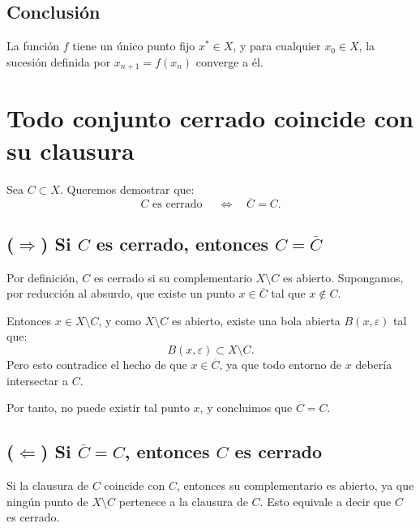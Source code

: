 \documentclass[12pt]{article}
\begin{document}
\subsection*{Conclusión}
La función $f$ tiene un único punto fijo $x^*\in X$, y para cualquier $x_0\in X$, la sucesión
definida por $x_{n+1}=f(x_n)$ converge a él.
\section*{Todo conjunto cerrado coincide con su clausura}

Sea $C \subset X$.  
Queremos demostrar que:
\[
C \text{ es cerrado } \quad \Longleftrightarrow \quad \overline{C} = C.
\]

\subsection*{($\Rightarrow$) Si $C$ es cerrado, entonces $C = \overline{C}$}
Por definición, $C$ es cerrado si su complementario $X \setminus C$ es abierto.  
Supongamos, por reducción al absurdo, que existe un punto $x \in \overline{C}$ tal que $x \notin C$.

Entonces $x \in X \setminus C$, y como $X \setminus C$ es abierto, existe una bola abierta
$B(x,\varepsilon)$ tal que:
\[
B(x,\varepsilon) \subset X \setminus C.
\]
Pero esto contradice el hecho de que $x \in \overline{C}$, ya que todo entorno de $x$
debería intersectar a $C$.  

\begin{center}
\end{center}

Por tanto, no puede existir tal punto $x$, y concluimos que $\overline{C} = C$.

\subsection*{($\Leftarrow$) Si $\overline{C} = C$, entonces $C$ es cerrado}
Si la clausura de $C$ coincide con $C$, entonces su complementario es abierto,
ya que ningún punto de $X\setminus C$ pertenece a la clausura de $C$.  
Esto equivale a decir que $C$ es cerrado.
\end{document}

